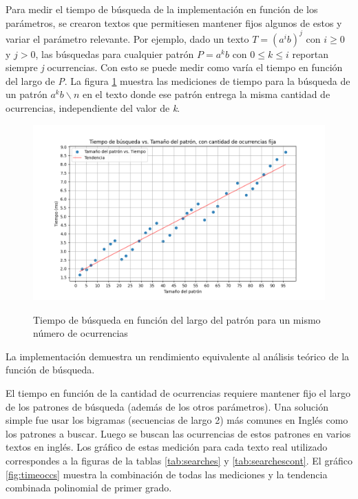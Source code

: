 Para medir el tiempo de búsqueda de la implementación en función de los parámetros, se crearon textos que permitiesen mantener fijos algunos de estos y variar el parámetro relevante. Por ejemplo, dado un texto $T = (a^{i}b)^j$ con $i \geq 0$ y $j > 0$, las búsquedas para cualquier patrón $P = a^{k}b$ con $0 \leq k \leq i$ reportan siempre \textit{j} ocurrencias. Con esto se puede medir como varía el tiempo en función del largo de \textit{P}. La figura \ref{fig:timepl} muestra las mediciones de tiempo para la búsqueda de un patrón $a^{k}b \backslash n$ en el texto donde ese patrón entrega la misma cantidad de ocurrencias, independiente del valor de \textit{k}.

\begin{figure}[h!]
    \centering
    \captionsetup{position=above} %
    \caption{Tiempo de búsqueda en función del largo del patrón para un mismo número de ocurrencias}
    \includegraphics[width=1\textwidth]{imagenes/TIME_FIXED_OCC.png} %
    \label{fig:timepl}
\end{figure}

La implementación demuestra un rendimiento equivalente al análisis teórico de la función de búsqueda.

El tiempo en función de la cantidad de ocurrencias requiere mantener fijo el largo de los patrones de búsqueda (además de los otros parámetros). Una solución simple fue usar los bigramas (secuencias de largo 2) más comunes en Inglés\cite{bigram} como los patrones a buscar. Luego se buscan las ocurrencias de estos patrones en varios textos en inglés. Los gráfico de estas medición para cada texto real utilizado correspondes a la figuras de la tablas \ref{tab:searches} y \ref{tab:searchescont}. El gráfico \ref{fig:timeoccs} muestra la combinación de todas las mediciones y la tendencia combinada polinomial de primer grado. 

